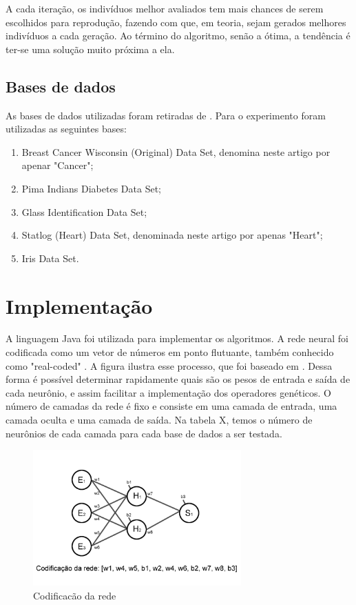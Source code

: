 \documentclass[12pt]{article}
\begin{document}
\par A cada iteração, os indivíduos melhor avaliados tem mais chances de serem escolhidos para reprodução, fazendo com que, em teoria, sejam gerados melhores indivíduos a cada geração. Ao término do algoritmo, senão a ótima, a tendência é ter-se uma solução muito próxima a ela.







\subsection{Bases de dados}

\par As bases de dados utilizadas foram retiradas de \cite{frank}. Para o experimento foram utilizadas as seguintes bases:

\begin{enumerate}
	\item Breast Cancer Wisconsin (Original) Data Set, denomina neste artigo por apenar "Cancer";
	\item Pima Indians Diabetes Data Set;
	\item Glass Identification Data Set;
	\item Statlog (Heart) Data Set, denominada neste artigo por apenas "Heart";
	\item Iris Data Set.
\end{enumerate}





\section{Implementação}\label{sec:imple}

\par A linguagem Java foi utilizada para implementar os algoritmos. A rede neural foi codificada como um vetor de números em ponto flutuante, também conhecido como "real-coded" \cite{Liu}. A figura ilustra esse processo, que foi baseado em \cite{montana}. Dessa forma é possível determinar rapidamente quais são os pesos de entrada e saída de cada neurônio, e assim facilitar a implementação dos operadores genéticos. O número de camadas da rede é fixo e consiste em uma camada de entrada, uma camada oculta e uma camada de saída. Na tabela X, temos o número de neurônios de cada camada para cada base de dados a ser testada.

\begin{figure}[codificacao]
\centering
\includegraphics[width=80mm]{codificacao.png}
\caption{Codificacão da rede}
\end{figure}
\end{document}
